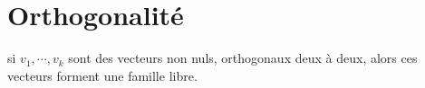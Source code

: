 \section{Orthogonalité}

\begin{proposition}			\label{PropVectsOrthLibres}
	si $v_1,\cdots,v_k$ sont des vecteurs non nuls, orthogonaux deux à deux, alors ces vecteurs forment une famille libre.
\end{proposition}

